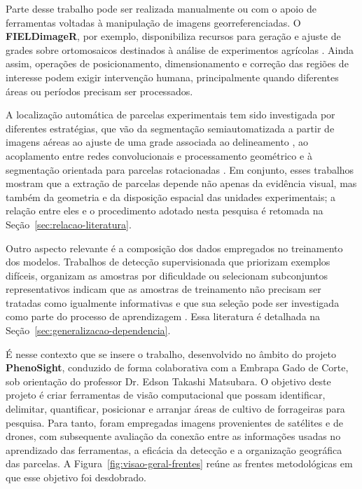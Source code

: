 Parte desse trabalho pode ser realizada manualmente ou com o apoio de ferramentas voltadas \`a manipula\c{c}\~ao de imagens georreferenciadas. O \textbf{FIELDimageR}, por exemplo, disponibiliza recursos para gera\c{c}\~ao e ajuste de grades sobre ortomosaicos destinados \`a an\'alise de experimentos agr\'icolas \citep{matias2020}. Ainda assim, opera\c{c}\~oes de posicionamento, dimensionamento e corre\c{c}\~ao das regi\~oes de interesse podem exigir interven\c{c}\~ao humana, principalmente quando diferentes \'areas ou per\'iodos precisam ser processados.

A localiza\c{c}\~ao autom\'atica de parcelas experimentais tem sido investigada por diferentes estrat\'egias, que v\~ao da segmenta\c{c}\~ao semiautomatizada a partir de imagens a\'ereas \citep{robb2020} ao ajuste de uma grade associada ao delineamento \citep{khan2019,mardanisamani2021}, ao acoplamento entre redes convolucionais e processamento geom\'etrico \citep{han2024} e \`a segmenta\c{c}\~ao orientada para parcelas rotacionadas \citep{zhang2025}. Em conjunto, esses trabalhos mostram que a extra\c{c}\~ao de parcelas depende n\~ao apenas da evid\^encia visual, mas tamb\'em da geometria e da disposi\c{c}\~ao espacial das unidades experimentais; a rela\c{c}\~ao entre eles e o procedimento adotado nesta pesquisa \'e retomada na Se\c{c}\~ao~\ref{sec:relacao-literatura}.

Outro aspecto relevante \'e a composi\c{c}\~ao dos dados empregados no treinamento dos modelos. Trabalhos de detec\c{c}\~ao supervisionada que priorizam exemplos dif\'iceis, organizam as amostras por dificuldade ou selecionam subconjuntos representativos indicam que as amostras de treinamento n\~ao precisam ser tratadas como igualmente informativas e que sua sele\c{c}\~ao pode ser investigada como parte do processo de aprendizagem \citep{shrivastava2016,wang2018,lee2024}. Essa literatura \'e detalhada na Se\c{c}\~ao~\ref{sec:generalizacao-dependencia}.

\'E nesse contexto que se insere o trabalho, desenvolvido no \^ambito do projeto \textbf{PhenoSight}, conduzido de forma colaborativa com a Embrapa Gado de Corte, sob orienta\c{c}\~ao do professor Dr. Edson Takashi Matsubara. O objetivo deste projeto \'e criar ferramentas de vis\~ao computacional que possam identificar, delimitar, quantificar, posicionar e arranjar \'areas de cultivo de forrageiras para pesquisa. Para tanto, foram empregadas imagens provenientes de sat\'elites e de drones, com subsequente avalia\c{c}\~ao da conex\~ao entre as informa\c{c}\~oes usadas no aprendizado das ferramentas, a efic\'acia da detec\c{c}\~ao e a organiza\c{c}\~ao geogr\'afica das parcelas. A Figura~\ref{fig:visao-geral-frentes} re\'une as frentes metodol\'ogicas em que esse objetivo foi desdobrado.

